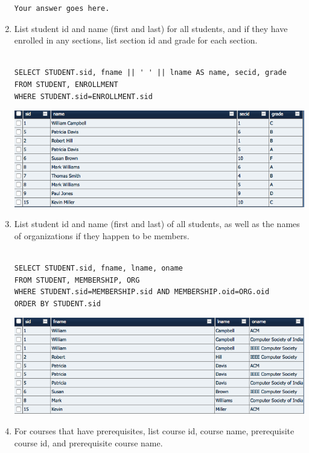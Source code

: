 \documentclass[11pt]{article}
\begin{document}
\begin{enumerate}
\begin{verbatim}
Your answer goes here.

\end{verbatim}

\item List student id and name (first and last) for all students, and if they have enrolled in any sections, list section id and grade for each section.

\begin{verbatim}

SELECT STUDENT.sid, fname || ' ' || lname AS name, secid, grade
FROM STUDENT, ENROLLMENT
WHERE STUDENT.sid=ENROLLMENT.sid

\end{verbatim}

\includegraphics[scale=0.5]{34.png}

\item List student id and name (first and last) of all students, as well as the names of organizations if they happen to be members.

\begin{verbatim}

SELECT STUDENT.sid, fname, lname, oname
FROM STUDENT, MEMBERSHIP, ORG
WHERE STUDENT.sid=MEMBERSHIP.sid AND MEMBERSHIP.oid=ORG.oid
ORDER BY STUDENT.sid

\end{verbatim}

\includegraphics[scale=0.5]{35.png}

\item For courses that have prerequisites, list course id, course name, prerequisite course id, and prerequisite course name.


\end{enumerate}
\end{document}
